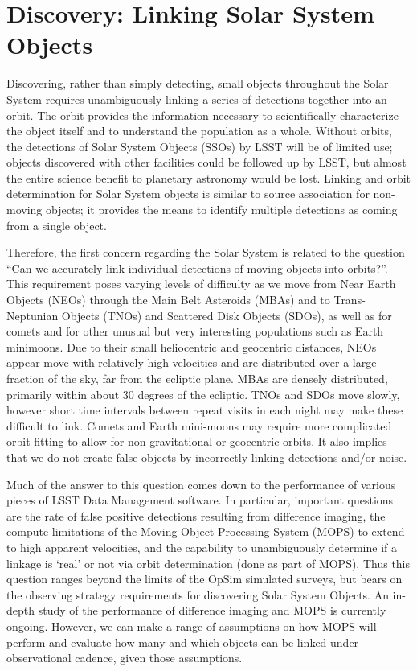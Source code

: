 
\section{Discovery: Linking Solar System Objects}
\def\secname{\chpname:discovery}\label{sec:\secname}

Discovering, rather than simply detecting, small objects throughout
the Solar System requires unambiguously linking a series of detections
together into an orbit. The orbit provides the information necessary
to scientifically characterize the object itself and to understand the
population as a whole. Without orbits, the detections of Solar System
Objects (SSOs) by LSST will be of limited use; objects discovered with
other facilities could be followed up by LSST, but almost the entire
science benefit to planetary astronomy would be lost. Linking and
orbit determination for Solar System objects is similar to source
association for non-moving objects; it provides the means to identify
multiple detections as coming from a single object.

Therefore, the first concern regarding the Solar System is related
to the question ``Can we accurately link individual detections of moving objects into
orbits?''.  This requirement poses varying levels of difficulty as we
move from Near Earth Objects (NEOs) through the Main Belt Asteroids
(MBAs) and to Trans-Neptunian Objects (TNOs) and Scattered Disk Objects
(SDOs), as well as for comets and for other unusual but very
interesting populations such as Earth minimoons. Due to their small
heliocentric and geocentric distances, NEOs appear move with
relatively high velocities and are distributed over a large fraction
of the sky, far from the ecliptic plane. MBAs are densely distributed,
primarily within about 30 degrees of the ecliptic. TNOs and SDOs move
slowly, however short time intervals between repeat visits in each night may make these difficult
to link. Comets and Earth mini-moons may require more complicated
orbit fitting to allow for non-gravitational or geocentric
orbits. It also implies that we do not create false objects by
incorrectly linking detections and/or noise.

Much of the answer to this question comes down to the performance of
various pieces of LSST Data Management software. In particular,
important questions are the
rate of false positive detections resulting from difference imaging, the compute
limitations of the Moving Object Processing System (MOPS) to extend to high
apparent velocities, and the capability to unambiguously determine if
a linkage is `real' or not via orbit determination (done as part of
MOPS). Thus this question ranges beyond the limits of the OpSim simulated
surveys, but bears on the observing strategy requirements for
discovering Solar System Objects. An in-depth study of the performance
of difference imaging and MOPS is currently ongoing. However, we can
make a range of assumptions on how MOPS will perform and evaluate how
many and which objects can be linked under observational cadence, given those assumptions.


